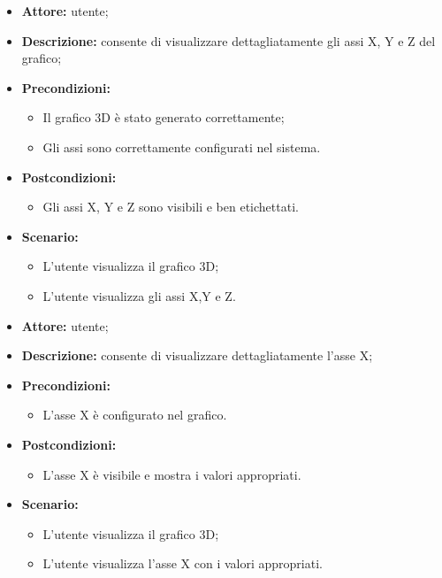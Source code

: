 \begin{itemize}
    \item \textbf{Attore:} utente;
    \item \textbf{Descrizione:} consente di visualizzare dettagliatamente gli assi X, Y e Z del grafico;
    \item \textbf{Precondizioni:} 
    \begin{itemize}
        \item Il grafico 3D è stato generato correttamente;
        \item Gli assi sono correttamente configurati nel sistema.
    \end{itemize}
    \item \textbf{Postcondizioni:}
    \begin{itemize}
        \item Gli assi X, Y e Z sono visibili e ben etichettati.
    \end{itemize}
    \item \textbf{Scenario:}
    \begin{itemize}
        \item L'utente visualizza il grafico 3D;
        \item L'utente visualizza gli assi X,Y e Z.
    \end{itemize}

\end{itemize}
\begin{itemize}
    \item \textbf{Attore:} utente;
    \item \textbf{Descrizione:} consente di visualizzare dettagliatamente l'asse X;
    \item \textbf{Precondizioni:} 
    \begin{itemize}
        \item L'asse X è configurato nel grafico.
    \end{itemize}
    \item \textbf{Postcondizioni:} 
    \begin{itemize}
        \item L'asse X è visibile e mostra i valori appropriati.
    \end{itemize}
    \item \textbf{Scenario:} 
    \begin{itemize}
        \item L'utente visualizza il grafico 3D;
        \item L'utente visualizza l'asse X con i valori appropriati.
    \end{itemize}
\end{itemize}
